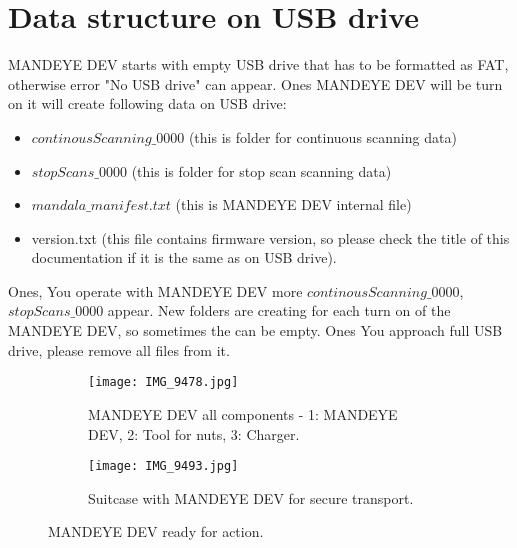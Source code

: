 \section{Data structure on USB drive}
MANDEYE DEV starts with empty USB drive that has to be formatted as FAT, otherwise error "No USB drive" can appear.
Ones MANDEYE DEV will be turn on it will create following data on USB drive:
\begin{itemize}
	\item $continousScanning\_0000$ (this is folder for continuous scanning data)
	\item $stopScans\_0000$ (this is folder for stop scan scanning data)
	\item $mandala\_manifest.txt$ (this is MANDEYE DEV internal file)
	\item version.txt (this file contains firmware version, so please check the title of this documentation if it is the same as on USB drive).
\end{itemize}
Ones, You operate with MANDEYE DEV more  $continousScanning\_0000$, $stopScans\_0000$ appear. 
New folders are creating for each turn on of the MANDEYE DEV, so sometimes the can be empty.
Ones You approach full USB drive, please remove all files from it.
	
\begin{figure}
	\centering
	\begin{subfigure}[b]{0.7\textwidth}
		\centering
		\texttt{[image: IMG\_9478.jpg]}
		\caption{MANDEYE DEV all components - 1: MANDEYE DEV, 2: Tool for nuts, 3: Charger.}
		\label{fig:m1}
	\end{subfigure}
	\hfill
	\begin{subfigure}[b]{0.7\textwidth}
		\centering
		\texttt{[image: IMG\_9493.jpg]}
		\caption{Suitcase with MANDEYE DEV for secure transport.}
		\label{fig:m2}
	\end{subfigure}
	\caption{MANDEYE DEV ready for action.}
	\label{fig:mandeye_harware}
\end{figure}


